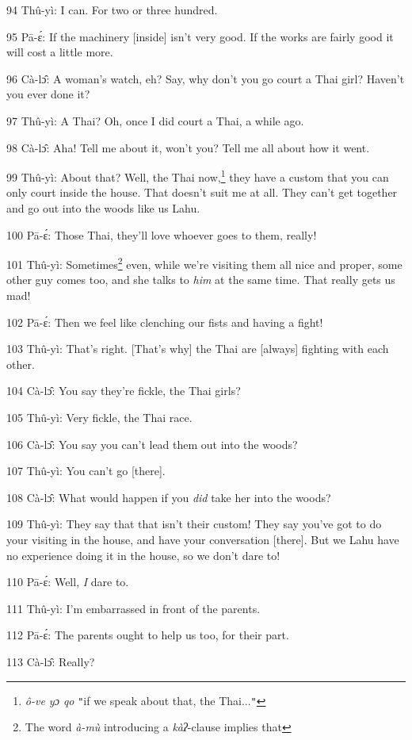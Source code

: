 94 Thû-yì: I can. For two or three hundred.

95 Pā-ɛ́: If the machinery [inside] isn't very good. If the works are fairly
good it will cost a little more.

96 Cà-lɔ̂: A woman's watch, eh? Say, why don't you go court a Thai girl? Haven't
you ever done it?

97 Thû-yì: A Thai? Oh, once I did court a Thai, a while ago.

98 Cà-lɔ̂: Aha! Tell me about it, won't you? Tell me all about how it went.

99 Thû-yì: About that? Well, the Thai now,\footnote{\textit{ô-ve yɔ qo} \texttt{"}if we speak about that, the Thai...\texttt{"}} they have a custom that you can
only court inside the house. That doesn't suit me at all. They can't get together
and go out into the woods like us Lahu.

100 Pā-ɛ́: Those Thai, they'll love whoever goes to them, really!

101 Thû-yì: Sometimes\footnote{The word \textit{à-mù} introducing a \textit{kàʔ}-clause implies that} even, while we're visiting them all nice and proper,
some other guy comes too, and she talks to \textit{him} at the same time. That
really gets us mad!

102 Pā-ɛ́: Then we feel like clenching our fists and having a fight!

103 Thû-yì: That's right. [That's why] the Thai are [always] fighting with each
other.

104 Cà-lɔ̂: You say they're fickle, the Thai girls?

105 Thû-yì: Very fickle, the Thai race.

106 Cà-lɔ̂: You say you can't lead them out into the woods?

107 Thû-yì: You can't go [there].

108 Cà-lɔ̂: What would happen if you \textit{did} take her into the woods?

109 Thû-yì: They say that that isn't their custom! They say you've got to do
your visiting in the house, and have your conversation [there]. But we Lahu have
no experience doing it in the house, so we don't dare to!

110 Pā-ɛ́: Well,\textit{ I} dare to.

111 Thû-yì: I'm embarrassed in front of the parents.

112 Pā-ɛ́: The parents ought to help us too, for their part.

113 Cà-lɔ̂: Really?


